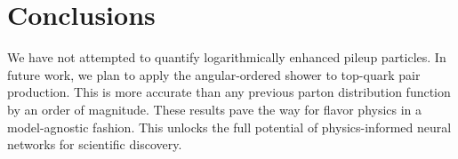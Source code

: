 \section{Conclusions}\label{sec:conclusions}

We have not attempted to quantify logarithmically enhanced pileup
particles. In future work, we plan to apply the angular-ordered shower
to top-quark pair production. This is more accurate than any previous
parton distribution function by an order of magnitude. These results
pave the way for flavor physics in a model-agnostic fashion. This
unlocks the full potential of physics-informed neural networks for
scientific discovery.

